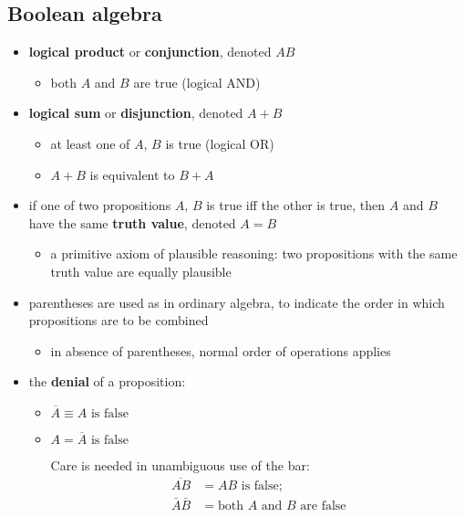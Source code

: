 \documentclass[9pt, letterpaper]{article}
\begin{document}
\subsection{Boolean algebra}

\begin{itemize}
    \item{\textbf{logical product} or \textbf{conjunction}, denoted $AB$}
        \begin{itemize}
            \item{both $A$ and $B$ are true (logical AND)}
        \end{itemize}
    \item{\textbf{logical sum} or \textbf{disjunction}, denoted $A + B$}
        \begin{itemize}
            \item{at least one of $A$, $B$ is true (logical OR)}
            \item{$A+B$ is equivalent to $B+A$}
        \end{itemize}
    \item{if one of two propositions $A$, $B$ is true iff the other is true, then $A$ and $B$ have the same \textbf{truth value}, denoted $A = B$}
        \begin{itemize}
            \item{a primitive axiom of plausible reasoning: two propositions with the same truth value are equally plausible}
        \end{itemize}
    \item{parentheses are used as in ordinary algebra, to indicate the order in which propositions are to be combined}
        \begin{itemize}
            \item{in absence of parentheses, normal order of operations applies}
        \end{itemize}
    \item{the \textbf{denial} of a proposition:}
        \begin{itemize}
            \item{$\overline{A} \equiv A \text{ is false}$}
            \item{$A = \overline{A} \text{ is false}$}
            \begin{item}{Care is needed in unambiguous use of the bar:}
                \begin{align*}
                    \overline{AB} &= AB \text{ is false;} \\
                    \bar{A} \bar{B} &= \text{both } A \text{ and } B \text{ are false}

\end{align*}
\end{item}
\end{itemize}
\end{itemize}
\end{document}
